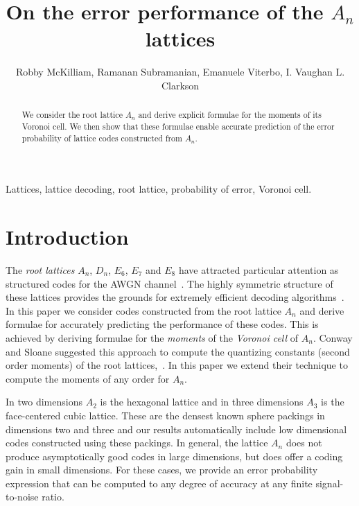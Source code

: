 \documentclass[draftcls, onecolumn, 11pt]{IEEEtran}
\title{On the error performance of the $A_n$ lattices}
\author{Robby McKilliam, Ramanan Subramanian, Emanuele Viterbo, I. Vaughan L. Clarkson}
\begin{document}
\newcommand{\calR}{\mathcal{R}}
\newcommand{\hist}{\operatorname{hist}}

\maketitle

\begin{abstract}
We consider the root lattice $A_n$ and derive explicit formulae for
the moments of its Voronoi cell.  We then show that these formulae
enable accurate prediction of the error probability of
lattice codes constructed from $A_n$.
\end{abstract}

\begin{keywords}
Lattices, lattice decoding, root lattice, probability of error, Voronoi cell.
\end{keywords}

\section{Introduction}\label{sec:introduction}


The \emph{root lattices} $A_n$, $D_n$, $E_6$, $E_7$ and $E_8$ have attracted particular attention as structured codes for the AWGN channel~\cite{SPLAG}. The highly symmetric structure of these lattices provides the grounds for extremely efficient decoding algorithms~\cite{Conway1982FastQuantDec,McKilliam2009CoxeterLattices,McKilliam2008}.  In this paper we consider codes constructed from the root lattice $A_n$ and derive formulae for accurately predicting the performance of these codes.  This is achieved by deriving formulae for the \emph{moments} of the \emph{Voronoi cell} of $A_n$.  Conway and Sloane suggested this approach to compute the quantizing constants (second order moments) of the root lattices,~\cite{Conway1982VoronoiRegions}.  In this paper we extend their technique to compute the moments of any order for $A_n$.

In two dimensions $A_2$ is the hexagonal lattice and in three dimensions $A_3$ is the face-centered cubic lattice.  These are the densest known sphere packings in dimensions two and three and our results automatically include low dimensional codes constructed using these packings.  In general, the lattice $A_n$ does not produce asymptotically good codes in large dimensions, but does offer a coding gain in small dimensions.  For these cases, we provide an error probability expression that can be computed to any degree of accuracy at any finite signal-to-noise ratio.
\end{document}
